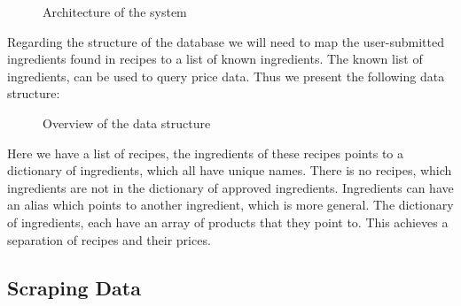 \documentclass{article}
\begin{document}
\begin{figure}[H]
  \centering
  \caption{Architecture of the system}
  \label{fig:layerstructure}
\end{figure}

Regarding the structure of the database we will need to map the user-submitted ingredients
found in recipes to a list of known ingredients. The known list of ingredients, can be
used to query price data. Thus we present the following data structure:

\begin{figure}[H]
  \centering
  \caption{Overview of the data structure}
\end{figure}

Here we have a list of recipes, the ingredients of these recipes points to a dictionary of
ingredients, which all have unique names. There is no recipes, which ingredients are not
in the dictionary of approved ingredients. Ingredients can have an alias which points to
another ingredient, which is more general.  The dictionary of ingredients, each have an
array of products that they point to. This achieves a separation of recipes and their
prices. 

\subsection{Scraping Data}
\end{document}
